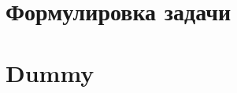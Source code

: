





\newpage
\tableofcontents

\newpage
\section{Формулировка задачи}

\newpage
\section{Dummy}

\cite{book:2994279}

\newpage
\printbibliography[heading=bibnumbered]


